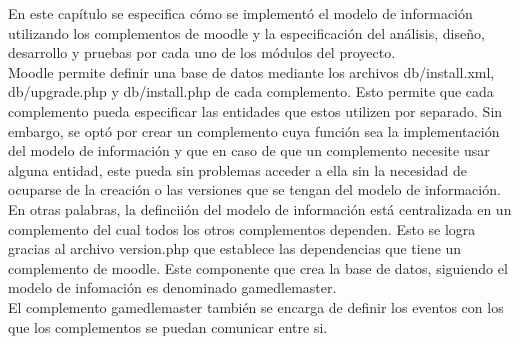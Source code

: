 
En este capítulo se especifica cómo se implementó el modelo de información utilizando los complementos de moodle
y la especificación del análisis, diseño, desarrollo y pruebas
por cada uno de los módulos del proyecto. \\

\noindent Moodle permite definir una base de datos mediante los archivos db/install.xml, db/upgrade.php y db/install.php de cada complemento.
Esto permite que cada complemento pueda especificar las entidades que estos utilizen por separado. 
Sin embargo, se optó por crear un complemento cuya función sea la implementación del modelo de información
y que en caso de que un complemento necesite usar alguna entidad, este pueda sin problemas acceder a ella 
sin la necesidad de ocuparse de la creación o las versiones que se tengan
del modelo de información.\\

\noindent En otras palabras, la definciión del modelo de información está centralizada en
un complemento del cual todos los otros complementos dependen. Esto se logra gracias al archivo version.php que establece
las dependencias que tiene un complemento de moodle. Este componente que crea la base de datos,
siguiendo el modelo de infomación es denominado gamedlemaster.\\

\noindent El complemento gamedlemaster también se encarga de definir
los eventos con los que los complementos se puedan comunicar entre si.

